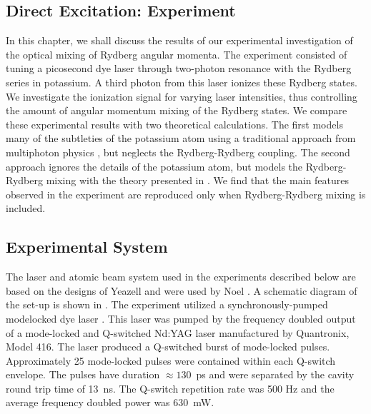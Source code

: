 \begin{singlespace}

\chapter{Direct Excitation: Experiment}
\label{step}
\begpagestyle

\end{singlespace}


In this chapter, we shall discuss the results of our experimental
investigation of the optical mixing of Rydberg angular momenta.  The
experiment consisted of tuning a picosecond dye laser through two-photon
resonance with the Rydberg series in potassium.  A third photon from this
laser ionizes these Rydberg states.  We investigate the ionization signal
for varying laser intensities, thus controlling the amount of angular momentum
mixing of the Rydberg states.  We compare these experimental results with two
theoretical calculations.  The first models many of the subtleties of the
potassium atom using a traditional approach from multiphoton physics
\cite{Lambropoulos:92}, but neglects the Rydberg-Rydberg coupling.  The second
approach ignores the details of the potassium atom, but models the
Rydberg-Rydberg mixing with the theory presented in .  We
find that the main features observed in the experiment are reproduced only
when Rydberg-Rydberg mixing is included.


\section{Experimental System}
\hspace{\parindent}
The laser and atomic beam system used in the experiments described below
are based on the designs of Yeazell \cite{Yeazell_thesis} and were used by Noel
\cite{Noel_thesis}.  A schematic diagram of the set-up is shown in
. The experiment utilized a synchronously-pumped modelocked
dye laser \cite{Wisoff:85}.  This laser was pumped by the frequency doubled
output of a mode-locked and Q-switched Nd:YAG laser \cite{Dawson:84}
manufactured by Quantronix, Model 416.  The laser produced a Q-switched burst
of mode-locked pulses.  Approximately 25 mode-locked pulses were contained
within each Q-switch envelope.  The pulses have duration $\approx 130$~ps and
were separated by the cavity round trip time of 13~ns.  The Q-switch
repetition rate was 500 Hz and the average frequency doubled power was
630~mW.

